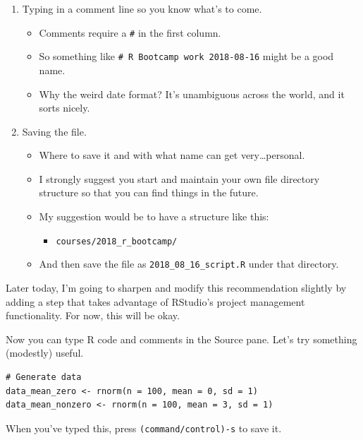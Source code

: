 \documentclass[]{article}
\providecommand{\tightlist}{%
  \setlength{\itemsep}{0pt}\setlength{\parskip}{0pt}}
\begin{document}
\begin{enumerate}
\def\labelenumi{\arabic{enumi}.}
\tightlist
\item
  Typing in a comment line so you know what's to come.

  \begin{itemize}
  \tightlist
  \item
    Comments require a \texttt{\#} in the first column.
  \item
    So something like \texttt{\#\ R\ Bootcamp\ work\ 2018-08-16} might
    be a good name.
  \item
    Why the weird date format? It's unambiguous across the world, and it
    sorts nicely.
  \end{itemize}
\item
  Saving the file.

  \begin{itemize}
  \tightlist
  \item
    Where to save it and with what name can get very\ldots{}personal.
  \item
    I strongly suggest you start and maintain your own file directory
    structure so that you can find things in the future.
  \item
    My suggestion would be to have a structure like this:

    \begin{itemize}
    \tightlist
    \item
      \texttt{courses/2018\_r\_bootcamp/}
    \end{itemize}
  \item
    And then save the file as \texttt{2018\_08\_16\_script.R} under that
    directory.
  \end{itemize}
\end{enumerate}

Later today, I'm going to sharpen and modify this recommendation
slightly by adding a step that takes advantage of RStudio's project
management functionality. For now, this will be okay.

Now you can type R code and comments in the Source pane. Let's try
something (modestly) useful.

\begin{verbatim}
# Generate data
data_mean_zero <- rnorm(n = 100, mean = 0, sd = 1)
data_mean_nonzero <- rnorm(n = 100, mean = 3, sd = 1)
\end{verbatim}

When you've typed this, press \texttt{(command/control)-s} to save it.
\end{document}
